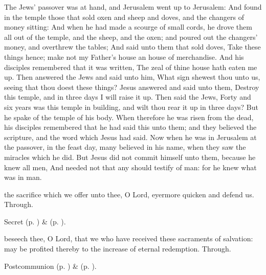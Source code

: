  The Jews' passover was at hand, and Jerusalem went up to Jerusalem: And found in the temple those that sold oxen and sheep and doves, and the changers of money sitting: And when he had made a scourge of small cords, he drove them all out of the temple, and the sheep, and the oxen; and poured out the changers' money, and overthrew the tables; And said unto them that sold doves, Take these things hence; make not my Father's house an house of merchandise. And his disciples remembered that it was written, The zeal of thine house hath eaten me up. Then answered the Jews and said unto him, What sign shewest thou unto us, seeing that thou doest these things? Jesus answered and said unto them, Destroy this temple, and in three days I will raise it up. Then said the Jews, Forty and six years was this temple in building, and wilt thou rear it up in three days? But he spake of the temple of his body. When therefore he was risen from the dead, his disciples remembered that he had said this unto them; and they believed the scripture, and the word which Jesus had said. Now when he was in Jerusalem at the passover, in the feast day, many believed in his name, when they saw the miracles which he did. But Jesus did not commit himself unto them, because he knew all men, And needed not that any should testify of man: for he knew what was in man.


\secret
{} the sacrifice which we offer unto thee, O Lord, eyermore quicken and defend us. Through.


\begin{rubric}
     Secret  (p. \pageref{AshWednesdayMassSecret}) \&   (p. \pageref{SPLivingDeparted}).
\end{rubric}


\postcommunion
{} beseech thee, O Lord, that we who have received these sacraments of salvation: may be profited thereby to the increase of eternal redemption. Through.
\begin{rubric}
     Postcommunion  (p. \pageref{AshWednesdayMassPostcommunion}) \&   (p. \pageref{SPLivingDeparted}).
\end{rubric}

